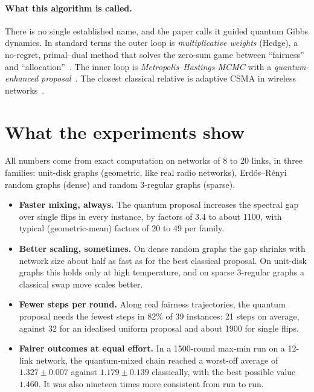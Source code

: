 \documentclass[11pt,a4paper]{article}
\begin{document}
\paragraph{What this algorithm is called.} There is no single established name, and the paper calls it
guided quantum Gibbs dynamics. In standard terms the outer loop is \emph{multiplicative weights} (Hedge),
a no-regret, primal--dual method that solves the zero-sum game between ``fairness'' and
``allocation''~\cite{freundschapire}. The inner loop is \emph{Metropolis--Hastings MCMC} with a
\emph{quantum-enhanced proposal}~\cite{layden}. The closest classical relative is adaptive CSMA in
wireless networks~\cite{jiangwalrand}.

\section{What the experiments show}

All numbers come from exact computation on networks of 8 to 20 links, in three families: unit-disk
graphs (geometric, like real radio networks), Erd\H{o}s--R\'enyi random graphs (dense) and random
3-regular graphs (sparse).

\begin{itemize}[leftmargin=*]
\item \textbf{Faster mixing, always.} The quantum proposal increases the spectral gap over single flips
in every instance, by factors of 3.4 to about 1100, with typical (geometric-mean) factors of 20 to 49 per
family.
\item \textbf{Better scaling, sometimes.} On dense random graphs the gap shrinks with network size about
half as fast as for the best classical proposal. On unit-disk graphs this holds only at high
temperature, and on sparse 3-regular graphs a classical swap move scales better.
\item \textbf{Fewer steps per round.} Along real fairness trajectories, the quantum proposal needs the
fewest steps in 82\% of 39 instances: 21 steps on average, against 32 for an idealised uniform proposal
and about 1900 for single flips.
\item \textbf{Fairer outcomes at equal effort.} In a 1500-round max-min run on a 12-link network, the
quantum-mixed chain reached a worst-off average of $1.327\pm0.007$ against $1.179\pm0.139$ classically,
with the best possible value $1.460$. It was also nineteen times more consistent from run to run.
\end{itemize}
\end{document}
